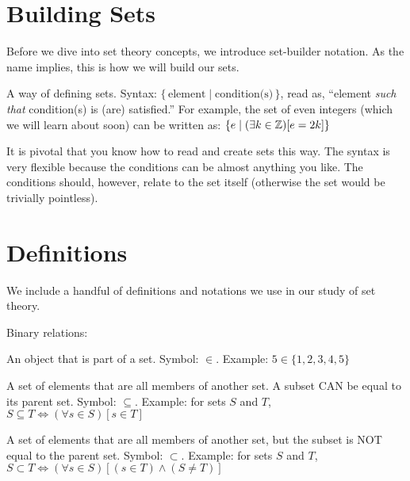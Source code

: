 \documentclass[main.tex]{subfiles}
\begin{document}
\section{Building Sets}

Before we dive into set theory concepts, we introduce set-builder notation. As the name implies, this is how we will build our sets.

\begin{defn}
	A way of defining sets. Syntax: \(\{\,\mbox{element} \mid \mbox{condition(s)}\,\}\), read as, ``element \textit{such that} condition(s) is (are) satisfied.'' For example, the set of even integers (which we will learn about soon) can be written as: \(\{e \mid (\exists k \in \mathbb{Z})[e = 2k]\}\)
\end{defn}

It is pivotal that you know how to read and create sets this way. The syntax is very flexible because the conditions can be almost anything you like. The conditions should, however, relate to the set itself (otherwise the set would be trivially pointless).



\section{Definitions}

We include a handful of definitions and notations we use in our study of set theory.

Binary relations:

\begin{defn}
	An object that is part of a set. Symbol: \(\in\). Example: \(5 \in \{1,2,3,4,5\}\)
\end{defn}

\begin{defn}[Subset]
	A set of elements that are all members of another set. A subset CAN be equal to its parent set. Symbol: \(\subseteq\). Example: for sets \(S\) and \(T\), \(S \subseteq T \Leftrightarrow (\forall s \in S)[s \in T]\)
\end{defn}

\begin{defn}
	A set of elements that are all members of another set, but the subset is NOT equal to the parent set. Symbol: \(\subset\). Example: for sets \(S\) and \(T\), \(S \subset T \Leftrightarrow (\forall s \in S)[(s \in T) \land (S \neq T)]\)
\end{defn}
\end{document}
